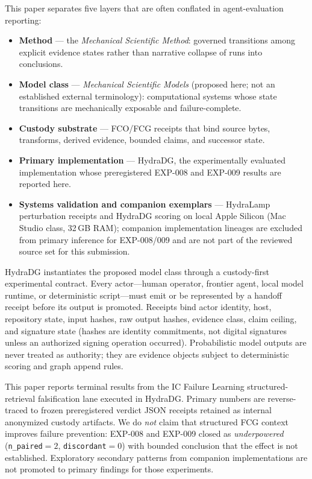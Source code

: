 \documentclass{article}
\begin{document}
This paper separates five layers that are often conflated in agent-evaluation reporting:
\begin{itemize}
  \item \textbf{Method} --- the \emph{Mechanical Scientific Method}: governed transitions among explicit evidence states rather than narrative collapse of runs into conclusions.
  \item \textbf{Model class} --- \emph{Mechanical Scientific Models} (proposed here; not an established external terminology): computational systems whose state transitions are mechanically exposable and failure-complete.
  \item \textbf{Custody substrate} --- FCO/FCG receipts that bind source bytes, transforms, derived evidence, bounded claims, and successor state.
  \item \textbf{Primary implementation} --- HydraDG, the experimentally evaluated implementation whose preregistered EXP-008 and EXP-009 results are reported here.
  \item \textbf{Systems validation and companion exemplars} --- HydraLamp perturbation receipts and HydraDG scoring on local Apple Silicon (Mac Studio class, 32\,GB RAM); companion implementation lineages are excluded from primary inference for EXP-008/009 and are not part of the reviewed source set for this submission.
\end{itemize}

HydraDG instantiates the proposed model class through a custody-first experimental contract.
Every actor---human operator, frontier agent, local model runtime, or deterministic script---must emit or be represented by a handoff receipt before its output is promoted.
Receipts bind actor identity, host, repository state, input hashes, raw output hashes, evidence class, claim ceiling, and signature state (hashes are identity commitments, not digital signatures unless an authorized signing operation occurred).
Probabilistic model outputs are never treated as authority; they are evidence objects subject to deterministic scoring and graph append rules.

This paper reports terminal results from the IC Failure Learning structured-retrieval falsification lane executed in HydraDG.
Primary numbers are reverse-traced to frozen preregistered verdict JSON receipts retained as internal anonymized custody artifacts.
We do \emph{not} claim that structured FCG context improves failure prevention: EXP-008 and EXP-009 closed as \emph{underpowered} (\texttt{n\_paired}$=2$, \texttt{discordant}$=0$) with bounded conclusion that the effect is not established.
Exploratory secondary patterns from companion implementations are not promoted to primary findings for those experiments.
\end{document}
